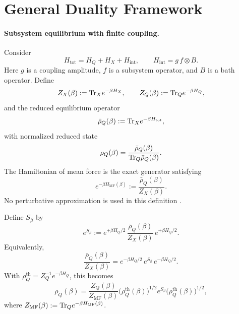 \section{General Duality Framework}
\label{sec:general_framework}

\paragraph{Subsystem equilibrium with finite coupling.}
Consider
\begin{equation}
  H_{\mathrm{tot}} = H_Q + H_X + H_{\mathrm{int}}, \qquad
  H_{\mathrm{int}} = g\,f\otimes B.
\end{equation}
Here \(g\) is a coupling amplitude, \(f\) is a subsystem operator, and \(B\) is a bath operator.
Define
\begin{equation}
  Z_X(\beta):=\mathrm{Tr}_X e^{-\beta H_X}, \qquad
  Z_Q(\beta):=\mathrm{Tr}_Q e^{-\beta H_Q},
\end{equation}
and the reduced equilibrium operator
\begin{equation}
  \bar{\rho}_Q(\beta):=\mathrm{Tr}_X e^{-\beta H_{\mathrm{tot}}},
\end{equation}
with normalized reduced state
\begin{equation}
  \rho_Q(\beta)=\frac{\bar{\rho}_Q(\beta)}{\mathrm{Tr}_Q \bar{\rho}_Q(\beta)}.
\end{equation}
The Hamiltonian of mean force is the exact generator satisfying
\begin{equation}
  e^{-\beta H_{\mathrm{MF}}(\beta)}
  := \frac{\bar{\rho}_Q(\beta)}{Z_X(\beta)}.
\end{equation}
No perturbative approximation is used in this definition
\cite{gelinThermodynamicsSubensembleCanonical2009a,hiltHamiltonianMeanForce2011,talknerColloquiumStatisticalMechanics2020,rivasStrongCouplingThermodynamics2020}.

\begin{definition}
\label{def:influence_operator}
Define \(S_\beta\) by
\begin{equation}
  e^{S_\beta}
  := e^{+\beta H_Q/2}\,\frac{\bar{\rho}_Q(\beta)}{Z_X(\beta)}\,e^{+\beta H_Q/2}.
\end{equation}
Equivalently,
\begin{equation}
  \frac{\bar{\rho}_Q(\beta)}{Z_X(\beta)}
  = e^{-\beta H_Q/2}\,e^{S_\beta}\,e^{-\beta H_Q/2}.
\end{equation}
With \(\rho_Q^{\mathrm{th}}=Z_Q^{-1}e^{-\beta H_Q}\), this becomes
\begin{equation}
  \rho_Q(\beta)
  = \frac{Z_Q(\beta)}{Z_{\mathrm{MF}}(\beta)}
  \big(\rho_Q^{\mathrm{th}}(\beta)\big)^{1/2}
  e^{S_\beta}
  \big(\rho_Q^{\mathrm{th}}(\beta)\big)^{1/2},
\end{equation}
where \(Z_{\mathrm{MF}}(\beta):=\mathrm{Tr}_Q e^{-\beta H_{\mathrm{MF}}(\beta)}\).
\end{definition}

